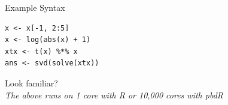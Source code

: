

\begin{frame}[fragile]
  \begin{block}{Example Syntax}\pause
  \begin{lstlisting}
x <- x[-1, 2:5]
x <- log(abs(x) + 1)
xtx <- t(x) %*% x
ans <- svd(solve(xtx))
  \end{lstlisting}
  \begin{center}
  \pause Look familiar?\\[.4cm] \pause
  \emph{The above runs on 1 core with R or 10,000 cores with pbdR}
  \end{center}
  \end{block}
\end{frame}


